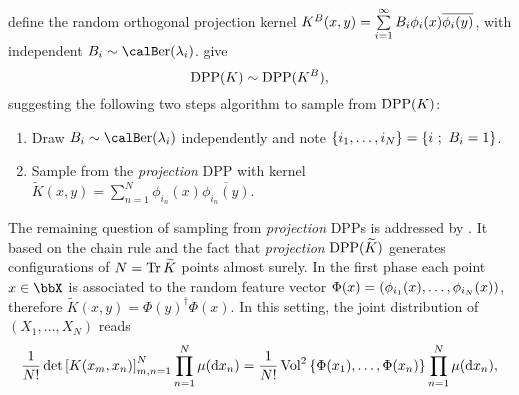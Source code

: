 \documentclass[twoside,11pt]{article}
\begin{document}
      define the random orthogonal projection kernel
      $
        K^B(x,y) 
          = \sum\limits_{i=1}^{\infty} B_i \phi_i(x) \overline{\phi_i(y)}
      $, with independent $B_i\sim\Ber(\lambda_i)$.
      \citet[Theorem 7]{HKPV06} give 
      \begin{equation}
        \operatorname{DPP}(K) \sim \operatorname{DPP}(K^B),
      \end{equation} 
      suggesting the following two steps algorithm to sample from $\operatorname{DPP}(K)$:
      \begin{enumerate}
        \item Draw $B_i\sim\Ber(\lambda_i)$ independently and note $\left\{ i_1,\dots,i_{N} \right\} = \left\{ i~;~B_i=1 \right\}$.
        \item Sample from the \textit{projection} DPP with kernel $\tilde{K}(x,y) = \sum_{n=1}^{N}\phi_{i_n}(x) \overline{\phi_{i_n}(y)}$.
      \end{enumerate}

      The remaining question of sampling from \textit{projection} DPPs is addressed by \citet[Algorithm 18]{HKPV06}.
      It based on the chain rule and the fact that \textit{projection} $\operatorname{DPP}(\widetilde{K})$ generates configurations of $N=\operatorname{Tr} \widetilde{K}$ points almost surely.
      In the first phase each point $x\in \bbX$ is associated to the random feature vector $\Phi(x)=\left( \phi_{i_1}(x),\dots,\phi_{i_N}(x) \right)$, therefore $\tilde{K}(x,y) = \Phi(y)^{\dagger} \Phi(x)$.
      In this setting, the joint distribution of $(X_1,\dots,X_N)$ reads
      \begin{equation}
      \label{eq:joint_distribution}
        \frac{1}{N!} \det \left[ K(x_m,x_n) \right]_{m,n=1}^N \prod_{n=1}^N\mu(\mathop{}\!\mathrm{d} x_n)
          = \frac{1}{N!} \operatorname{Vol}^2\left\{ \Phi(x_1),\dots,\Phi(x_n) \right\} \prod_{n=1}^N\mu(\mathop{}\!\mathrm{d} x_n),
      \end{equation}
\end{document}
